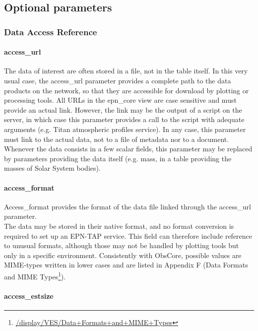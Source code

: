 \documentclass[11pt,a4paper]{ivoa}
\begin{document}
\subsection{Optional parameters}

\subsubsection{Data Access Reference}

\paragraph{access\_url}

The data of interest are often stored in a file, not in the table itself. In this very usual case, the access\_url parameter provides a complete path to the data products on the network, so that they are accessible for download by plotting or processing tools. All URLs in the epn\_core view are case sensitive and must provide an actual link. However, the link may be the output of a script on the server, in which case this parameter provides a call to the script with adequate arguments (e.g. Titan atmospheric profiles service). In any case, this parameter must link to the actual data, not to a file of metadata nor to a document.\\ Whenever the data consists in a few scalar fields, this parameter may be replaced by parameters providing the data itself (e.g. mass, in a table providing the masses of Solar System bodies).

\paragraph{access\_format}

Access\_format provides the format of the data file linked through the access\_url parameter. \\ The data may be stored in their native format, and no format conversion is required to set up an EPN-TAP service. This field can therefore include reference to unusual formats, although those may not be handled by plotting tools but only in a specific environment. Consistently with ObsCore, possible values are MIME-types written in lower cases and are listed in Appendix F (Data Formats and MIME Types\footnote{\url{/display/VES/Data+Formats+and+MIME+Types}}).

\paragraph{access\_estsize}
\end{document}
